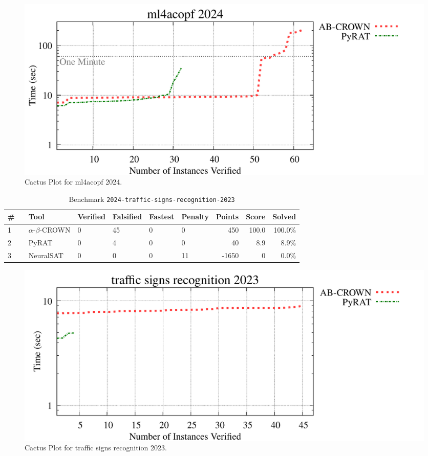 \begin{figure}[h]
\centerline{\includegraphics[width=\textwidth]{cactus/2024_ml4acopf_2024.pdf}}
\caption{Cactus Plot for ml4acopf 2024.}
\label{fig:quantPic}
\end{figure}


\clearpage

\begin{table}[h]
\begin{center}
\caption{Benchmark \texttt{2024-traffic-signs-recognition-2023}} \label{tab:cat_{cat}}
{\setlength{\tabcolsep}{2pt}
\begin{tabular}[h]{@{}llllllrrr@{}}
\toprule
\textbf{\# ~} & \textbf{Tool} & \textbf{Verified} & \textbf{Falsified} & \textbf{Fastest} & \textbf{Penalty} & \textbf{Points} & \textbf{Score} & \textbf{Solved}\\
\midrule
1 & $\alpha$-$\beta$-CROWN & 0 & 45 & 0 & 0 & 450 & 100.0 & 100.0\% \\
2 & PyRAT & 0 & 4 & 0 & 0 & 40 & 8.9 & 8.9\% \\
3 & NeuralSAT & 0 & 0 & 0 & 11 & -1650 & 0 & 0.0\% \\
\bottomrule
\end{tabular}
}
\end{center}
\end{table}



\begin{figure}[h]
\centerline{\includegraphics[width=\textwidth]{cactus/2024_traffic_signs_recognition_2023.pdf}}
\caption{Cactus Plot for traffic signs recognition 2023.}
\label{fig:quantPic}
\end{figure}



